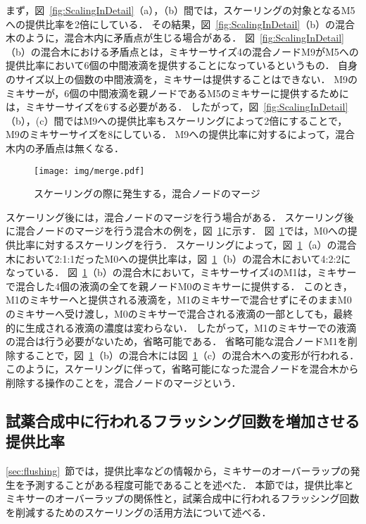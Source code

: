 まず，図~\ref{fig:ScalingInDetail}（a），（b）間では，スケーリングの対象となるM5への提供比率を2倍にしている．
その結果，図~\ref{fig:ScalingInDetail}（b）の混合木のように，混合木内に矛盾点が生じる場合がある．
図~\ref{fig:ScalingInDetail}（b）の混合木における矛盾点とは，ミキサーサイズ4の混合ノードM9がM5への提供比率において6個の中間液滴を提供することになっているというもの．
自身のサイズ以上の個数の中間液滴を，ミキサーは提供することはできない．
M9のミキサーが，6個の中間液滴を親ノードであるM5のミキサーに提供するためには，ミキサーサイズを6する必要がある．
したがって，図~\ref{fig:ScalingInDetail}（b），(c）間ではM9への提供比率もスケーリングによって2倍にすることで，M9のミキサーサイズを8にしている．
M9への提供比率に対するによって，混合木内の矛盾点は無くなる．

\begin{figure}[tbp]
 \centering\texttt{[image: img/merge.pdf]}
 \caption{スケーリングの際に発生する，混合ノードのマージ}\label{fig:Merge}
\end{figure}

スケーリング後には，混合ノードのマージを行う場合がある．
スケーリング後に混合ノードのマージを行う混合木の例を，図~\ref{fig:Merge}に示す．
図~\ref{fig:Merge}では，M0への提供比率に対するスケーリングを行う．
スケーリングによって，図~\ref{fig:Merge}（a）の混合木において2:1:1だったM0への提供比率は，図~\ref{fig:Merge}（b）の混合木において4:2:2になっている．
図~\ref{fig:Merge}（b）の混合木において，ミキサーサイズ4のM1は，ミキサーで混合した4個の液滴の全てを親ノードM0のミキサーに提供する．
このとき，M1のミキサーへと提供される液滴を，M1のミキサーで混合せずにそのままM0のミキサーへ受け渡し，M0のミキサーで混合される液滴の一部としても，最終的に生成される液滴の濃度は変わらない．
したがって，M1のミキサーでの液滴の混合は行う必要がないため，省略可能である．
省略可能な混合ノードM1を削除することで，図~\ref{fig:Merge}（b）の混合木には図~\ref{fig:Merge}（c）の混合木への変形が行われる．
このように，スケーリングに伴って，省略可能になった混合ノードを混合木から削除する操作のことを，混合ノードのマージという．

\subsection{試薬合成中に行われるフラッシング回数を増加させる提供比率}\label{ratio}
\ref{sec:flushing}~節では，提供比率などの情報から，ミキサーのオーバーラップの発生を予測することがある程度可能であることを述べた．
本節では，提供比率とミキサーのオーバーラップの関係性と，試薬合成中に行われるフラッシング回数を削減するためのスケーリングの活用方法について述べる．

